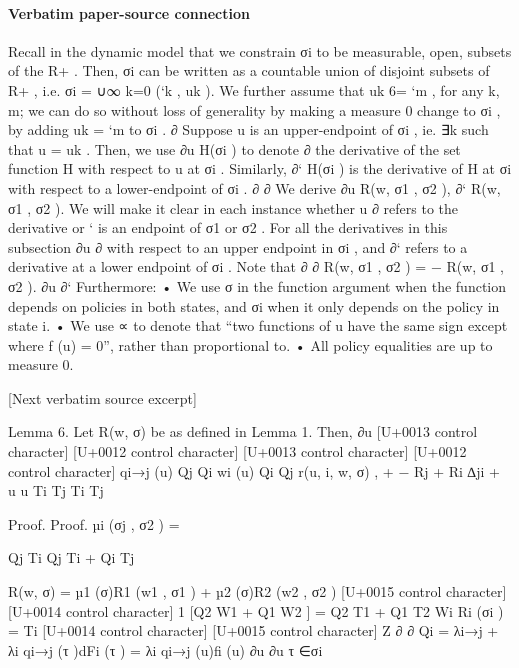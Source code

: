 \documentclass[10pt]{article}
\begin{document}
\paragraph{Verbatim paper-source connection}
\begin{ReviewVerbatim}
Recall in the dynamic model that we constrain σi to be measurable, open, subsets of the R+ . Then,
σi can be written as a countable union of disjoint subsets of R+ , i.e. σi = ∪∞
k=0 (`k , uk ). We further
assume that uk 6= `m , for any k, m; we can do so without loss of generality by making a measure 0
change to σi , by adding uk = `m to σi .
∂
Suppose u is an upper-endpoint of σi , ie. ∃k such that u = uk . Then, we use ∂u
H(σi ) to denote
∂
the derivative of the set function H with respect to u at σi . Similarly, ∂` H(σi ) is the derivative of
H at σi with respect to a lower-endpoint of σi .
∂
∂
We derive ∂u
R(w, {σ1 , σ2 }), ∂`
R(w, {σ1 , σ2 }). We will make it clear in each instance whether u
∂
refers to the derivative
or ` is an endpoint of σ1 or σ2 . For all the derivatives in this subsection ∂u
∂
with respect to an upper endpoint in σi , and ∂` refers to a derivative at a lower endpoint of σi .
Note that
∂
∂
R(w, {σ1 , σ2 }) = − R(w, {σ1 , σ2 }).
∂u
∂`
Furthermore:
• We use σ in the function argument when the function depends on policies in both states, and
σi when it only depends on the policy in state i.
• We use ∝ to denote that “two functions of u have the same sign except where f (u) = 0”,
rather than proportional to.
• All policy equalities are up to measure 0.

[Next verbatim source excerpt]

Lemma 6. Let R(w, σ) be as defined in Lemma 1. Then, ∂u
[U+0013 control character]
[U+0012 control character]
[U+0013 control character] [U+0012 control character]
qi→j (u)
Qj
Qi
wi (u) Qi Qj
r(u, i, w, σ) ,
+
−
Rj +
Ri
∆ji +
u
u
Ti
Tj
Ti
Tj

Proof. Proof.
µi ({σj , σ2 }) =

Qj Ti
Qj Ti + Qi Tj

R(w, σ) = µ1 (σ)R1 (w1 , σ1 ) + µ2 (σ)R2 (w2 , σ2 )
[U+0015 control character]
[U+0014 control character]
1
[Q2 W1 + Q1 W2 ]
=
Q2 T1 + Q1 T2
Wi
Ri (σi ) =
Ti
[U+0014 control character]
[U+0015 control character]
Z
∂
∂
Qi =
λi→j + λi
qi→j (τ )dFi (τ ) = λi qi→j (u)fi (u)
∂u
∂u
τ ∈σi
\end{ReviewVerbatim}
\end{document}
